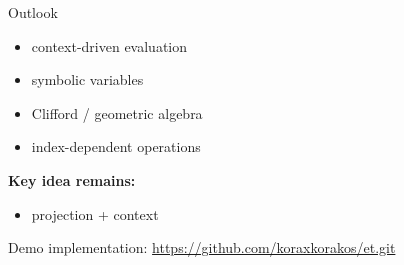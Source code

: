 \documentclass{beamer}
\begin{document}

\begin{frame}{Outlook}
\begin{itemize}
\item context-driven evaluation
\item symbolic variables
\item Clifford / geometric algebra
\item index-dependent operations
\end{itemize}

\vspace{1em}

\textbf{Key idea remains:}

\begin{itemize}
\item projection + context
\end{itemize}


\vfill
{\tiny Demo implementation: \url{https://github.com/koraxkorakos/et.git}}
\end{frame}
\end{document}
